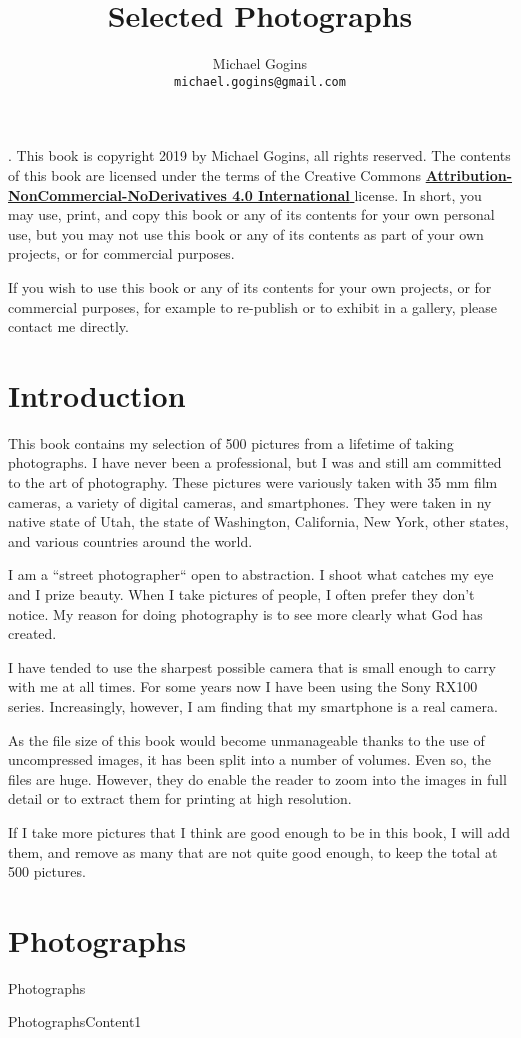 \documentclass[10pt,landscape,oneside]{book}
\begin{document}
\frontmatter
\title{Selected Photographs}
\author{Michael Gogins \\ \texttt{michael.gogins@gmail.com}}
.
\newpage
\noindent This book is copyright 2019 by Michael Gogins, all rights reserved. The contents of this book are licensed under the terms of the Creative Commons \href{https://creativecommons.org/licenses/by-nc-nd/4.0/legalcode}{\textbf{Attribution-NonCommercial-NoDerivatives 4.0 International} } license. In short, you may use, print, and copy this book or any of its contents for your own personal use, but you may not use this book or any of its contents as part of your own projects, or for commercial purposes.

If you wish to use this book or any of its contents for your own projects, or for commercial purposes, for example to re-publish or to exhibit in a gallery, please contact me directly.
\maketitle

\tableofcontents
\listoffigures

\mainmatter
\pagestyle{headings}

\chapter{Introduction}

This book contains my selection of 500 pictures from a lifetime of taking photographs. I have never been a professional, but I was and still am committed to the art of photography. These pictures were variously taken with 35 mm film cameras, a variety of digital cameras, and smartphones. They were taken in ny native state of Utah, the state of Washington, California, New York, other states, and various countries around the world. 

I am a ``street photographer`` open to abstraction. I shoot what catches my eye and I prize beauty. When I take pictures of people, I often prefer they don't notice. My reason for doing photography is to see more clearly what God has created.

I have tended to use the sharpest possible camera that is small enough to carry with me at all times. For some years now I have been using the Sony RX100 series. Increasingly, however, I am finding that my smartphone is a real camera.

As the file size of this book would become unmanageable thanks to the use of uncompressed images, it has been split into a number of volumes. Even so, the files are huge. However, they do enable the reader to zoom into the images in full detail or to extract them for printing at high resolution.

If I take more pictures that I think are good enough to be in this book, I will add them, and remove as many that are not quite good enough, to keep the total at 500 pictures.

\chapter{Photographs}

 {Photographs}

 {PhotographsContent1}
\end{document}
